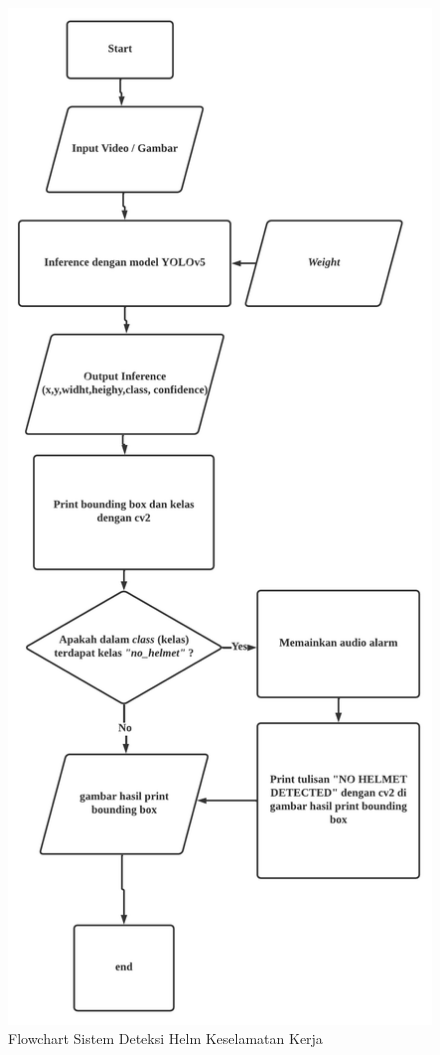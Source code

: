 \begin{figure}[ht]
  \centering
  \includegraphics[scale=0.55]{gambar/flowchart_sistemhedec.png}
  \caption{Flowchart Sistem Deteksi Helm Keselamatan Kerja}
  \label{fig:flchartdeteksi}  
\end{figure}

